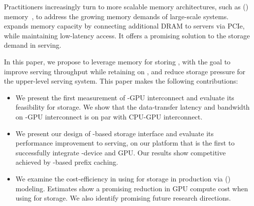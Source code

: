 Practitioners increasingly turn to more scalable memory architectures, such as \cxlfull (\cxl) memory~\cite{cxl1, cxl2, pond}, to address the growing memory demands of large-scale systems. 
\cxl{} expands memory capacity by connecting additional DRAM to servers via PCIe, while maintaining low-latency access. It offers a promising solution to the \kvcache storage demand in \llm serving.

In this paper, we propose to leverage \cxl memory for storing \kvcache, with the goal to improve serving throughput while retaining \slo on \ttft, and reduce \kvcache storage pressure for the upper-level \llm serving system. This paper makes the following contributions:
\begin{itemize} 
\item{} We present the first measurement of \cxl-GPU interconnect and evaluate its feasibility for \kvcache storage. We show that the data-transfer latency and bandwidth on \cxl-GPU interconnect is on par with CPU-GPU interconnect. 
\item{} We present our design of \cxl-based \kvcache storage interface and evaluate its performance improvement to \llm serving, on our platform that is the first to successfully integrate \asic-\cxl device and GPU. Our results show competitive \ttft achieved by \cxl-based prefix caching.
\item{} We examine the cost-efficiency in using \cxl for \kvcache storage in production via \roifull (\roi) modeling. Estimates show a promising reduction in GPU compute cost when using \cxl for \kvcache storage. We also identify promising future research directions.
\end{itemize}


